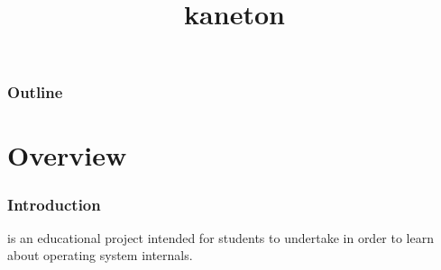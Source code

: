 %
%
%
%
%
%

%
%

%
%

\def\path{../../..}

%
%



%
%

\title{kaneton}

%
%



%
%

\begin{frame}
  \titlepage
\end{frame}

%
%

\begin{frame}
  \frametitle{Outline}

  \tableofcontents
\end{frame}

%
%


%
%

\section{Overview}


\begin{frame}
  \frametitle{Introduction}

   is an educational project intended for students to undertake
  in order to learn about operating system internals.
\end{frame}


